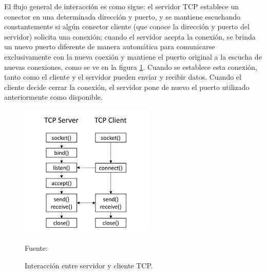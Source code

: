

El flujo general de interacción es como sigue: el servidor TCP establece un conector en una determinada dirección y puerto, y se mantiene escuchando constantemente si algún conector cliente (que conoce la dirección y puerto del servidor) solicita una conexión; cuando el servidor acepta la conexión, se brinda un nuevo puerto diferente de manera automática para comunicarse exclusivamente con la nueva coexión y mantiene el puerto original a la escucha de nuevas conexiones, como se ve en la figura \ref{fig:tcp_flow}. Cuando se establece esta conexión, tanto como el cliente y el servidor pueden enviar y recibir datos. Cuando el cliente decide cerrar la conexión, el servidor pone de nuevo el puerto utilizado anteriormente como disponible.\\

\begin{figure}[H]
    \begin{center}
        \includegraphics[width=6.4cm]{img/capitulo_2/tcp.png}
    \end{center}
    \begin{center}
        \caption{Interacción entre servidor y cliente TCP.}
        Fuente: \cite{tcpsocket}
        \label{fig:tcp_flow}
    \end{center}
\end{figure}


